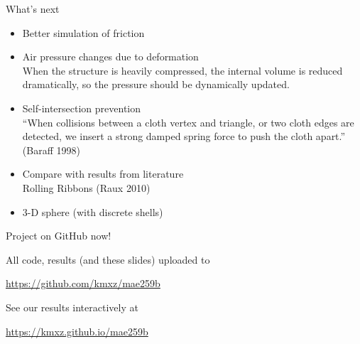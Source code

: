 \documentclass{beamer}
\newlength{\currentparskip}
\newenvironment{minipageparskip}[1]{\setlength{\currentparskip}{\parskip}\begin{minipage}{#1}\setlength{\parskip}{\currentparskip}}{\end{minipage}}
\begin{document}
	\begin{frame}{What's next}
		\begin{itemize}
			\item Better simulation of friction
			\item Air pressure changes due to deformation\\
			{\footnotesize When the structure is heavily compressed, the internal volume is reduced dramatically, so the pressure should be dynamically updated.}
			\item Self-intersection prevention\\
			{\footnotesize ``When collisions between a cloth vertex and triangle, or two cloth edges are detected, we insert a strong damped spring force to push the cloth apart.'' (Baraff 1998)} 
			\item Compare with results from literature\\
			{\footnotesize Rolling Ribbons (Raux 2010)}
			\item 3-D sphere (with discrete shells)
		\end{itemize}
	\end{frame}
	\begin{frame}{Project on GitHub now!}
		\begin{minipageparskip}{0.675\textwidth}
			All code, results (and these slides) uploaded to
	
			\url{https://github.com/kmxz/mae259b}
		
			See our results interactively at
		
			\url{https://kmxz.github.io/mae259b}
		\end{minipageparskip}%
		\hspace{0.025\textwidth}%
		\begin{minipageparskip}{0.3\textwidth}
		\end{minipageparskip}
	\end{frame}
\end{document}
